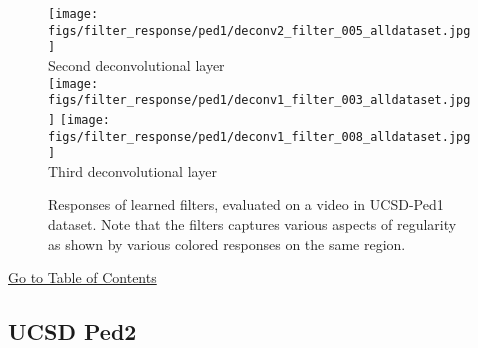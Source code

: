 \documentclass[10pt,twocolumn,letterpaper]{article}
\begin{document}
\begin{figure}[h]
	\texttt{[image: figs/filter\_response/ped1/deconv2\_filter\_005\_alldataset.jpg]}\\
	{\footnotesize Second deconvolutional layer}\\
	\texttt{[image: figs/filter\_response/ped1/deconv1\_filter\_003\_alldataset.jpg]}
	\texttt{[image: figs/filter\_response/ped1/deconv1\_filter\_008\_alldataset.jpg]}\\
	{\footnotesize Third deconvolutional layer}\\
	\caption{Responses of learned filters, evaluated on a video in UCSD-Ped1 dataset. Note that the filters captures various aspects of regularity as shown by various colored responses on the same region.}
\end{figure}

\begin{center}
	\hyperlink{page.11}{Go to Table of Contents}
\end{center}

\clearpage

\subsection{UCSD Ped2}
\label{sec:filter_res_vis_ped2}
\end{document}
